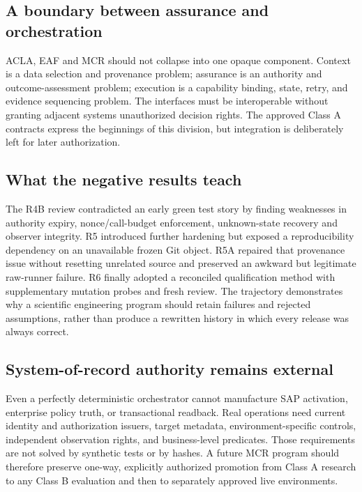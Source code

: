 \documentclass[11pt,twocolumn]{article}
\begin{document}
\subsection{A boundary between assurance and orchestration}
ACLA, EAF and MCR should not collapse into one opaque component. Context is a data selection and provenance problem; assurance is an authority and outcome-assessment problem; execution is a capability binding, state, retry, and evidence sequencing problem. The interfaces must be interoperable without granting adjacent systems unauthorized decision rights. The approved Class A contracts express the beginnings of this division, but integration is deliberately left for later authorization.

\subsection{What the negative results teach}
The R4B review contradicted an early green test story by finding weaknesses in authority expiry, nonce/call-budget enforcement, unknown-state recovery and observer integrity. R5 introduced further hardening but exposed a reproducibility dependency on an unavailable frozen Git object. R5A repaired that provenance issue without resetting unrelated source and preserved an awkward but legitimate raw-runner failure. R6 finally adopted a reconciled qualification method with supplementary mutation probes and fresh review. The trajectory demonstrates why a scientific engineering program should retain failures and rejected assumptions, rather than produce a rewritten history in which every release was always correct.

\subsection{System-of-record authority remains external}
Even a perfectly deterministic orchestrator cannot manufacture SAP activation, enterprise policy truth, or transactional readback. Real operations need current identity and authorization issuers, target metadata, environment-specific controls, independent observation rights, and business-level predicates. Those requirements are not solved by synthetic tests or by hashes. A future MCR program should therefore preserve one-way, explicitly authorized promotion from Class A research to any Class B evaluation and then to separately approved live environments.
\end{document}
